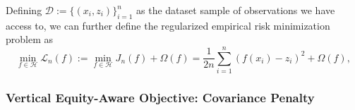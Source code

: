 \documentclass[11pt]{article}
\theoremstyle{plain}
\theoremstyle{definition}
\newcommand{\1}{\mathbf{1}}
\newcommand{\D}{\mathcal{D}}
\renewcommand{\L}{\mathcal{L}}
\renewcommand{\H}{\mathcal{H}}
\begin{document}
Defining $\D:=\{(x_i, z_i)\}_{i=1}^n$ as the dataset sample of observations we have access to, we can further define the regularized empirical risk minimization problem as  
\begin{equation}
\label{opt:unconstrained_learner}
\min_{f\in \H} \L_n(f) := \min_{f\in \H}  J_n(f) + \Omega(f) = \frac{1}{2n}\sum_{i=1}^n (f(x_i) - z_i)^2 + \Omega(f), %
\end{equation}




\subsubsection{Vertical Equity-Aware Objective: Covariance Penalty}
\end{document}
